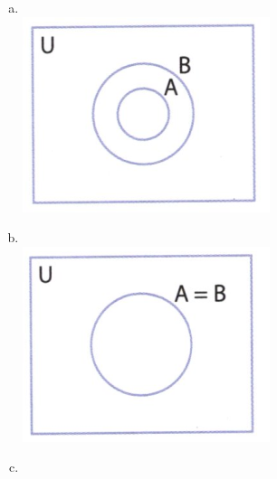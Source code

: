 \documentclass[a4paper,14pt]{article}
\begin{document}
\begin{multicols}{2}
\begin{enumerate}
\begin{enumerate}[a)]
   				\item ~ \\
   				\includegraphics[width=1\linewidth]{6FMA73_imagens/imagem03}
   				\item ~ \\
   				\includegraphics[width=1\linewidth]{6FMA73_imagens/imagem04}
   				\item ~ \\

\end{enumerate}
\end{enumerate}
\end{multicols}
\end{document}
